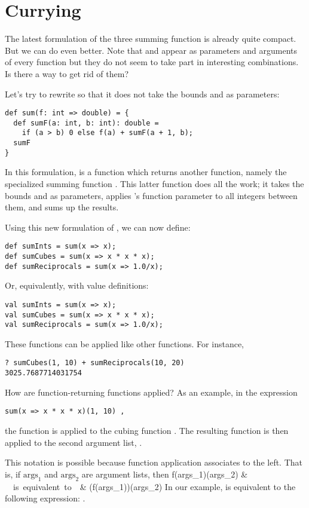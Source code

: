 \documentclass[a4paper,12pt,twoside,titlepage]{book}
\begin{document}
\section{Currying}

The latest formulation of the three summing function is already quite
compact. But we can do even better. Note that
 and  appear as parameters and arguments of every function
but they do not seem to take part in interesting combinations. Is
there a way to get rid of them?

Let's try to rewrite  so that it does not take the bounds
 and  as parameters:
\begin{lstlisting}
def sum(f: int => double) = {
  def sumF(a: int, b: int): double = 
    if (a > b) 0 else f(a) + sumF(a + 1, b);
  sumF
}
\end{lstlisting}
In this formulation,  is a function which returns another
function, namely the specialized summing function . This
latter function does all the work; it takes the bounds  and
 as parameters, applies 's function parameter  to all
integers between them, and sums up the results. 

Using this new formulation of , we can now define:
\begin{lstlisting}
def sumInts = sum(x => x);
def sumCubes = sum(x => x * x * x);
def sumReciprocals = sum(x => 1.0/x);
\end{lstlisting}
Or, equivalently, with value definitions:
\begin{lstlisting}
val sumInts = sum(x => x);
val sumCubes = sum(x => x * x * x);
val sumReciprocals = sum(x => 1.0/x);
\end{lstlisting}
These functions can be applied like other functions. For instance,
\begin{lstlisting}
? sumCubes(1, 10) + sumReciprocals(10, 20)
3025.7687714031754
\end{lstlisting}
How are function-returning functions applied? As an example, in the expression
\begin{lstlisting}
sum(x => x * x * x)(1, 10) ,
\end{lstlisting}
the function  is applied to the cubing function 
. The resulting function is then 
applied to the second argument list, .

This notation is possible because function application associates to the left.
That is, if $\mbox{args}_1$ and $\mbox{args}_2$ are argument lists, then 
f(\mbox{args}_1)(\mbox{args}_2) & \ \ \mbox{is equivalent to}\ \ & (f(\mbox{args}_1))(\mbox{args}_2)
\eda
In our example,  is equivalent to the
following expression:
.
\end{document}
